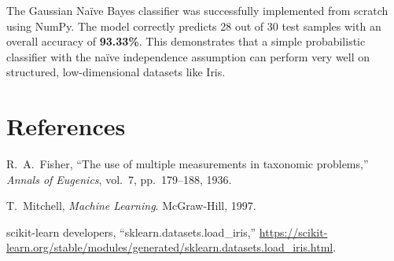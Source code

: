 \documentclass[12pt,a4paper]{article}
\begin{document}
The Gaussian Na\"{i}ve Bayes classifier was successfully implemented from scratch using NumPy. The model correctly predicts 28 out of 30 test samples with an overall accuracy of \textbf{93.33\%}. This demonstrates that a simple probabilistic classifier with the na\"{i}ve independence assumption can perform very well on structured, low-dimensional datasets like Iris.

\section{References}

\begin{enumerate}[label={[\arabic*]}]
  \item R.\ A.\ Fisher, ``The use of multiple measurements in taxonomic problems,'' \textit{Annals of Eugenics}, vol.\ 7, pp.\ 179--188, 1936.
  \item T.\ Mitchell, \textit{Machine Learning}. McGraw-Hill, 1997.
  \item scikit-learn developers, ``sklearn.datasets.load\_iris,'' \url{https://scikit-learn.org/stable/modules/generated/sklearn.datasets.load_iris.html}.
\end{enumerate}
\end{document}
